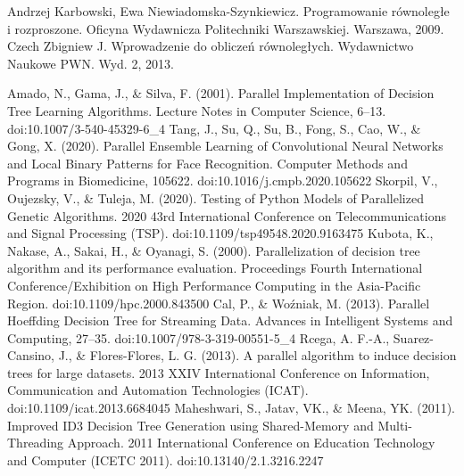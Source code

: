 \documentclass[12pt]{article}
\begin{document}
\begin{thebibliography}{6}

     Andrzej Karbowski, Ewa Niewiadomska-Szynkiewicz. Programowanie równoległe i rozproszone. Oficyna Wydawnicza Politechniki Warszawskiej. Warszawa, 2009.
     Czech Zbigniew J. Wprowadzenie do obliczeń równoległych. Wydawnictwo Naukowe PWN. Wyd. 2, 2013.
    
     Amado, N., Gama, J., \& Silva, F. (2001). Parallel Implementation of Decision Tree Learning Algorithms. Lecture Notes in Computer Science, 6–13. doi:10.1007/3-540-45329-6\_4 
     Tang, J., Su, Q., Su, B., Fong, S., Cao, W., \& Gong, X. (2020). Parallel Ensemble Learning of Convolutional Neural Networks and Local Binary Patterns for Face Recognition. Computer Methods and Programs in Biomedicine, 105622. doi:10.1016/j.cmpb.2020.105622
     Skorpil, V., Oujezsky, V., \& Tuleja, M. (2020). Testing of Python Models of Parallelized Genetic Algorithms. 2020 43rd International Conference on Telecommunications and Signal Processing (TSP). doi:10.1109/tsp49548.2020.9163475
     Kubota, K., Nakase, A., Sakai, H., \& Oyanagi, S. (2000). Parallelization of decision tree algorithm and its performance evaluation. Proceedings Fourth International Conference/Exhibition on High Performance Computing in the Asia-Pacific Region. doi:10.1109/hpc.2000.843500
     Cal, P., \& Woźniak, M. (2013). Parallel Hoeffding Decision Tree for Streaming Data. Advances in Intelligent Systems and Computing, 27–35. doi:10.1007/978-3-319-00551-5\_4
     Rcega, A. F.-A., Suarez-Cansino, J., \& Flores-Flores, L. G. (2013). A parallel algorithm to induce decision trees for large datasets. 2013 XXIV International Conference on Information, Communication and Automation Technologies (ICAT). doi:10.1109/icat.2013.6684045 
     Maheshwari, S., Jatav, VK., \& Meena, YK. (2011). Improved ID3 Decision Tree Generation using Shared-Memory and Multi-Threading Approach. 2011 International Conference on Education Technology and Computer (ICETC 2011). doi:10.13140/2.1.3216.2247

\end{thebibliography}
\end{document}
